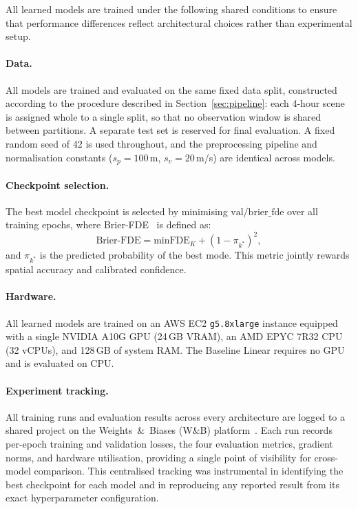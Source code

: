 \documentclass[12pt, a4paper]{article}
\begin{document}
All learned models are trained under the following shared conditions to
ensure that performance differences reflect architectural choices rather
than experimental setup.

\paragraph{Data.}
All models are trained and evaluated on the same fixed data split, constructed
according to the procedure described in Section~\ref{sec:pipeline}: each 4-hour
scene is assigned whole to a single split, so that no observation window is
shared between partitions.
A separate test set is reserved for final evaluation.
A fixed random seed of 42 is used throughout, and the preprocessing pipeline and
normalisation constants ($s_p = 100$\,m, $s_v = 20$\,m/s) are identical across
models.

\paragraph{Checkpoint selection.}
The best model checkpoint is selected by minimising
$\text{val/brier\_fde}$ over all training epochs, where
Brier-FDE~\citep{feng2024unitraj} is defined as:
\begin{equation}
  \text{Brier-FDE} = \text{minFDE}_K + (1 - \pi_{k^*})^2,
  \label{eq:brier_fde}
\end{equation}
and $\pi_{k^*}$ is the predicted probability of the best mode.
This metric jointly rewards spatial accuracy and calibrated confidence.

\paragraph{Hardware.}
All learned models are trained on an AWS EC2 \texttt{g5.8xlarge} instance
equipped with a single NVIDIA A10G GPU (24\,GB VRAM),
an AMD EPYC 7R32 CPU (32 vCPUs), and 128\,GB of system RAM.
The Baseline Linear requires no GPU and is evaluated on CPU.

\paragraph{Experiment tracking.}
All training runs and evaluation results across every architecture are logged to a shared project on the Weights~\&~Biases (W\&B)
platform~\citep{wandb2020}.  Each run records per-epoch training and validation
losses, the four evaluation metrics, gradient norms, and hardware utilisation,
providing a single point of visibility for cross-model comparison.  This
centralised tracking was instrumental in identifying the best checkpoint for each
model and in reproducing any reported result from its exact hyperparameter
configuration.
\end{document}
